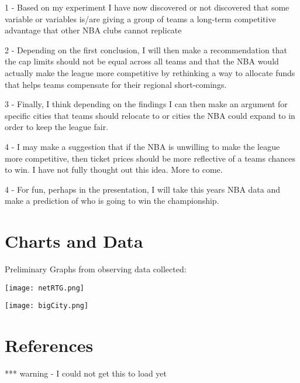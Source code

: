 \documentclass[12pt,english]{article}
\begin{document}
1 - Based on my experiment I have now discovered or not discovered that some variable or variables is/are giving a group of teams a long-term competitive advantage that other NBA clubs cannot replicate

2 - Depending on the first conclusion, I will then make a recommendation that the cap limits should not be equal across all teams and that the NBA would actually make the league more competitive by rethinking a way to allocate funds that helps teams compensate for their regional short-comings.

3 - Finally, I think depending on the findings I can then make an argument for specific cities that teams should relocate to or cities the NBA could expand to in order to keep the league fair.

4 -  I may make a suggestion that if the NBA is unwilling to make the league more competitive, then ticket prices should be more reflective of a teams chances to win. I have not fully thought out this idea. More to come. 


4 - For fun, perhaps in the presentation, I will take this years NBA data and make a prediction of who is going to win the championship.


\section{Charts and Data }\label{sec:data}

Preliminary Graphs from observing data collected:

\texttt{[image: netRTG.png]}

\texttt{[image: bigCity.png]}

\section{References}\label{sec:references}


*** warning - I could not get this to load yet 

\nocite{*}

\end{document}
